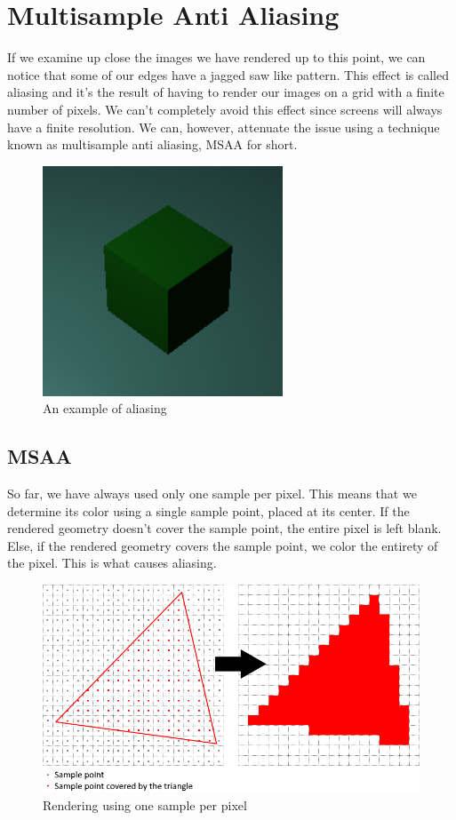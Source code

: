 \chapter{Multisample Anti Aliasing}

If we examine up close the images we have rendered up to this point, we
can notice that some of our edges have a jagged saw like pattern.
This effect is called aliasing and it's the result of having to render our
images on a grid with a finite number of pixels.
We can't completely avoid this effect since screens will always have a
finite resolution.
We can, however, attenuate the issue using a technique known as multisample
anti aliasing, MSAA for short.

\begin{figure}[H]
    \centering
    \includegraphics[scale=1.0]{images/ChMSAA/AnExampleOfAliasing.png}
    \caption{An example of aliasing}
    \label{fig::AliasingExample}
\end{figure}

\section{MSAA}

So far, we have always used only one sample per pixel.
This means that we determine its color using a single sample
point, placed at its center.
If the rendered geometry doesn't cover the sample point, the entire pixel
is left blank.
Else, if the rendered geometry covers the sample point, we color the entirety of
the pixel.
This is what causes aliasing.

\begin{figure}[H]
    \centering
    \includegraphics[scale=0.6]{images/ChMSAA/OneSamplePerPixel.png}
    \caption{Rendering using one sample per pixel}
    \label{fig::OneSamplePerPixel}
\end{figure}

